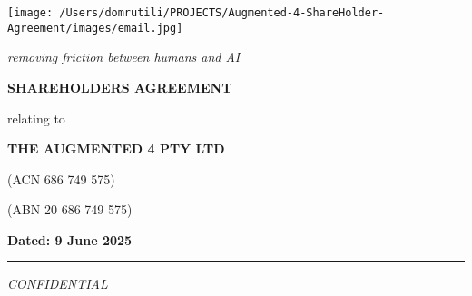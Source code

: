 \documentclass[11pt,a4paper]{article}
\begin{document}
\begin{titlepage}
    \centering
    \vspace*{1cm}
    
    \texttt{[image: /Users/domrutili/PROJECTS/Augmented-4-ShareHolder-Agreement/images/email.jpg]}
    \vspace{0.5cm}
    
    {\normalsize\itshape removing friction between humans and AI}
    \vspace{1.5cm}
    
    {\LARGE\bfseries SHAREHOLDERS AGREEMENT}
    \vspace{1.5cm}
    
    {\Large relating to}
    \vspace{0.8cm}
    
    {\Large\bfseries THE AUGMENTED 4 PTY LTD}
    \vspace{0.4cm}
    
    {\normalsize (ACN 686 749 575)}
    \vspace{0.2cm}
    
    {\normalsize (ABN 20 686 749 575)}
    \vspace{3cm}
    
    \begin{flushright}
    \textbf{Dated: 9 June 2025}
    \end{flushright}
    \vspace{3cm}
    
    \rule{0.5\textwidth}{0.5pt}
    
    \vspace{0.5cm}
    {\small\itshape CONFIDENTIAL}
\end{titlepage}

\newpage
\tableofcontents
\newpage

 



\newpage %
\end{document}
